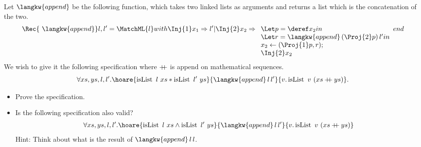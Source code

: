 \begin{exercise}
  \label{exercise:append}
  Let $\langkw{append}$ be the following function, which
  takes two linked lists as arguments and returns 
  a list which is the concatenation of the two.
  \begin{displaymath}
    \Rec{\ \langkw{append}} l, l' =
    \MatchML{l}with{\Inj{1} x_1}=>{l'}|{\Inj{2} x_2}=>{\begin{array}[t]{l}\Let p = \deref x_2 in\\
                                                         \Let r = \langkw{append}\, (\Proj{2} p)\, l' in\\
                                                         x_2 \gets (\Proj{1} p, r);\\
                                                         \Inj{2} x_2
                                                       \end{array}}end{}
  \end{displaymath}
  We wish to give it the following specification where $\mathbin{+\mkern-7mu+}$ is append on mathematical sequences.
  \begin{displaymath}
    \forall xs, ys, l, l'.\hoare{\isList {l} {xs} \ast \isList {l'} {ys}}{\langkw{append}\,l\,l'}{v.\isList {v} {(xs \mdoubleplus ys)}}.
  \end{displaymath}

  \begin{itemize}
  \item Prove the specification.
  \item Is the following specification also valid?
    \begin{align*}
      \forall xs, ys, l, l'.\hoare{\isList {l} {xs} \land \isList {l'} {ys}}{\langkw{append}\,l\,l'}{v.\isList {v} {(xs \mdoubleplus ys)}}
    \end{align*}
    Hint: Think about what is the result of $\langkw{append}\,l\,l$.
  \end{itemize}
\end{exercise}

